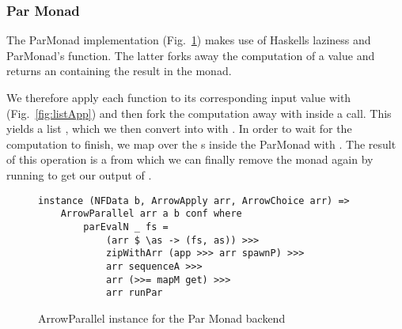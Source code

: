 \subsubsection{Par Monad}
The ParMonad implementation (Fig.~\ref{fig:ArrowParallelParMonad}) makes use of Haskells laziness and ParMonad's  function. The latter forks away the computation of a value and returns an  containing the result in the  monad.


We therefore apply each function to its corresponding input value with  (Fig.~\ref{fig:listApp}) and then fork the computation away with  inside a  call. This yields a list , which we then convert into  with . In order to wait for the computation to finish, we map over the s inside the ParMonad with . The result of this operation is a  from which we can finally remove the monad again by running  to get our output of \code{[b]}.
\begin{figure}[h]
\begin{lstlisting}[frame=htrbl]
instance (NFData b, ArrowApply arr, ArrowChoice arr) =>
	ArrowParallel arr a b conf where
		parEvalN _ fs = 
			(arr $ \as -> (fs, as)) >>>
			zipWithArr (app >>> arr spawnP) >>>
			arr sequenceA >>>
			arr (>>= mapM get) >>>
			arr runPar
\end{lstlisting} %
\caption{ArrowParallel instance for the Par Monad backend}
\label{fig:ArrowParallelParMonad}
\end{figure}

